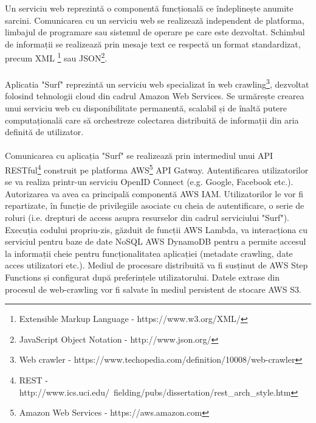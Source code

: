 \newcommand{\xmlDescription}{Extensible Markup Language - https://www.w3.org/XML/}
\newcommand{\jsonDescription}{JavaScript Object Notation - http://www.json.org/}
\newcommand{\crawlDescription}{Web crawler - https://www.techopedia.com/definition/10008/web-crawler}
\newcommand{\restDescription}{REST - http://www.ics.uci.edu/~fielding/pubs/dissertation/rest\_arch\_style.htm}
\newcommand{\awsDescription}{Amazon Web Services - https://aws.amazon.com}

Un serviciu web reprezintă o componentă funcțională ce îndeplinește anumite sarcini. Comunicarea cu un serviciu web se realizează independent de platforma, limbajul de programare sau sistemul de operare pe care este dezvoltat. Schimbul de informații se realizează prin mesaje text ce respectă un format standardizat, precum XML \footnote{\xmlDescription} sau JSON\footnote{\jsonDescription}. 
\\
\\
Aplicatia "Surf" reprezintă un serviciu web specializat în web crawling\footnote{\crawlDescription}, dezvoltat folosind tehnologii cloud din cadrul Amazon Web Services. Se urmărește crearea unui serviciu web cu disponibilitate permanentă, scalabil și de înaltă putere computațională care să orchestreze colectarea distribuită de informații din aria definită de utilizator.
\\
\\
Comunicarea cu aplicația "Surf" se realizează prin intermediul unui API RESTful\footnote{\restDescription} construit pe platforma AWS\footnote{\awsDescription} API Gatway. Autentificarea utilizatorilor se va realiza printr-un serviciu OpenID Connect (e.g. Google, Facebook etc.). Autorizarea va avea ca principală componentă AWS IAM. Utilizatorilor le vor fi repartizate, în funcție de privilegiile asociate cu cheia de autentificare, o serie de roluri (i.e. drepturi de access asupra resurselor din cadrul serviciului "Surf"). Execuția codului propriu-zis, găzduit de funcții AWS Lambda, va interacționa cu serviciul pentru baze de date NoSQL AWS DynamoDB pentru a permite accesul la informații cheie pentru funcționalitatea aplicației (metadate crawling, date acces utilizatori etc.). Mediul de procesare distribuită va fi susținut de AWS Step Functions și configurat după preferințele utilizatorului. Datele extrase din procesul de web-crawling vor fi salvate în mediul persistent de stocare AWS S3.
